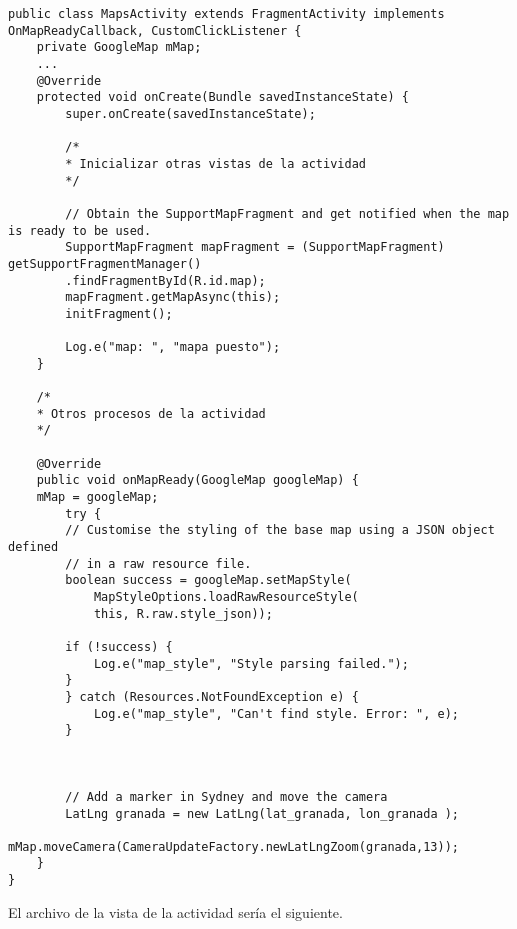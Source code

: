 \begin{lstlisting}[caption=código necesario para mostrar el mapa en la aplicación]
public class MapsActivity extends FragmentActivity implements OnMapReadyCallback, CustomClickListener {
	private GoogleMap mMap;
	...
	@Override
	protected void onCreate(Bundle savedInstanceState) {
		super.onCreate(savedInstanceState);
		
		/*
		* Inicializar otras vistas de la actividad
		*/
		
		// Obtain the SupportMapFragment and get notified when the map is ready to be used.
		SupportMapFragment mapFragment = (SupportMapFragment) getSupportFragmentManager()
		.findFragmentById(R.id.map);
		mapFragment.getMapAsync(this);
		initFragment();
		
		Log.e("map: ", "mapa puesto");
	}
	
	/*
	* Otros procesos de la actividad
	*/
	
	@Override
	public void onMapReady(GoogleMap googleMap) {
	mMap = googleMap;
		try {
		// Customise the styling of the base map using a JSON object defined
		// in a raw resource file.
		boolean success = googleMap.setMapStyle(
			MapStyleOptions.loadRawResourceStyle(
			this, R.raw.style_json));
		
		if (!success) {
			Log.e("map_style", "Style parsing failed.");
		}
		} catch (Resources.NotFoundException e) {
			Log.e("map_style", "Can't find style. Error: ", e);
		}
		
		
		
		// Add a marker in Sydney and move the camera
		LatLng granada = new LatLng(lat_granada, lon_granada );
		mMap.moveCamera(CameraUpdateFactory.newLatLngZoom(granada,13));
	}
}
\end{lstlisting}
El archivo de la vista de la actividad sería el siguiente.
